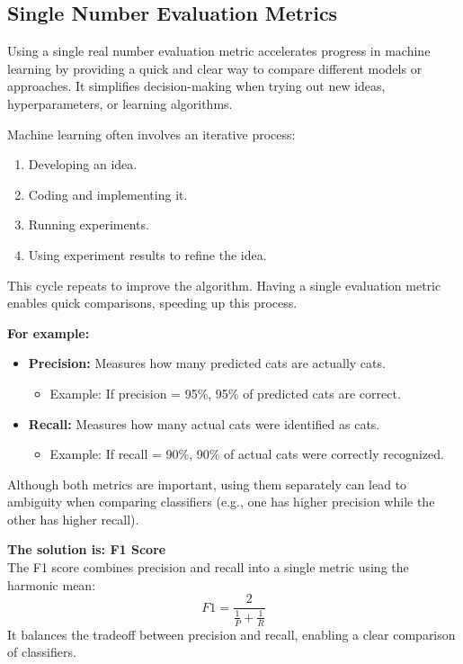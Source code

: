 \documentclass[letterpaper,12pt,notitlepage,twoside]{report}
\begin{document}
\subsection{Single Number Evaluation Metrics}
Using a single real number evaluation metric accelerates progress in machine learning by providing a quick and clear way to compare different models or approaches. It simplifies decision-making when trying out new ideas, hyperparameters, or learning algorithms.

Machine learning often involves an iterative process:
\begin{enumerate}[noitemsep, topsep=0pt]
    \item Developing an idea.
    \item Coding and implementing it.
    \item Running experiments.
    \item Using experiment results to refine the idea.
\end{enumerate}
This cycle repeats to improve the algorithm. Having a single evaluation metric enables quick comparisons, speeding up this process.

\textbf{For example:}
\begin{itemize}[noitemsep, topsep=0pt]
    \item \textbf{Precision:} Measures how many predicted cats are actually cats.  
        \begin{itemize}
            \item Example: If precision = 95\%, 95\% of predicted cats are correct.
        \end{itemize}
    \item \textbf{Recall:} Measures how many actual cats were identified as cats.  
        \begin{itemize}
            \item Example: If recall = 90\%, 90\% of actual cats were correctly recognized.
        \end{itemize}
\end{itemize}

Although both metrics are important, using them separately can lead to ambiguity when comparing classifiers (e.g., one has higher precision while the other has higher recall).

\textbf{The solution is: F1 Score} \\
The F1 score combines precision and recall into a single metric using the harmonic mean:
\[
F1 = \frac{2}{\frac{1}{P} + \frac{1}{R}}
\]
It balances the tradeoff between precision and recall, enabling a clear comparison of classifiers.
\end{document}
